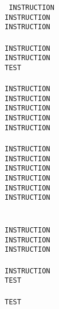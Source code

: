{\tt\noindent
INSTRUCTION\\
INSTRUCTION\\
INSTRUCTION\\
\\
INSTRUCTION\\
INSTRUCTION\\
TEST\\
\\
INSTRUCTION\\
INSTRUCTION\\
INSTRUCTION\\
INSTRUCTION\\
INSTRUCTION\\
\\
INSTRUCTION\\
INSTRUCTION\\
INSTRUCTION\\
INSTRUCTION\\
INSTRUCTION\\
INSTRUCTION\\
\\
\\
INSTRUCTION\\
INSTRUCTION\\
INSTRUCTION\\
\\
INSTRUCTION\\
TEST\\
\\
TEST\\
}